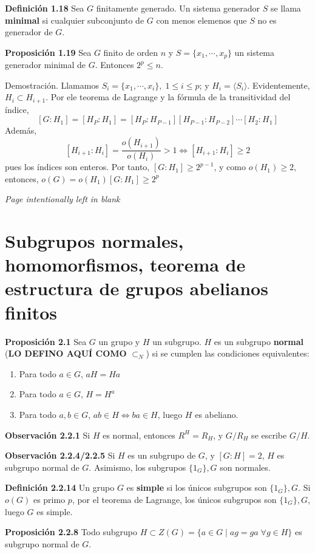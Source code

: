 \documentclass[a4paper, 11pt]{extarticle}
\newcommand{\propo}[1]{\textcolor{rojo}{\textbf{Proposición #1}}}
\newcommand{\defi}[1]{\textcolor{azul}{\textbf{Definición #1}}}
\newcommand{\obs}[1]{\textcolor{verde}{\textbf{Observación #1}}}
\newcommand{\dem}[1]{\textcolor{gris}{\small{Demostración. #1}}}
\begin{document}
\defi{1.18} Sea \(G\) finitamente generado. Un sistema generador \(S\) se
llama \textbf{minimal} si cualquier subconjunto de \(G\) con menos elemenos que \(S\)
no es generador de \(G\).

\propo{1.19} Sea \(G\) finito de orden \(n\) y \(S = \{ x_1, \cdots, x_p \}\)
un
sistema generador minimal de \(G\). Entonces \(2^p \le n\).

\dem{ Llamamos \( S_i = \{ x_1, \cdots, x_i \}, \; 1 \le i \le p \); y \( H_i = \langle S_i \rangle \). 
Evidentemente, \( H_i \subset H_{i+1}
\). Por ele teorema de Lagrange y la fórmula de la transitividad del índice,
\[ [G:H_1] = [H_P:H_1] = [H_P:H_{P-1}][H_{P-1}:H_{P-2}]\cdots[H_2:H_1] \]
Además, 
\[ [H_{i+1}:H_i] = \frac{o(H_{i+1})}{o(H_i)} > 1 \iff
[H_{i+1}:H_i] \ge 2 \]
pues los índices son enteros.
Por tanto, \( [G:H_1] \ge 2^{p-1} \), y como \( o(H_1) \ge 2 \), entonces,
\( o(G) = o(H_1)[G:H_1] \ge 2^p \)
}

\pagebreak
\textcolor{gris}{\textit{Page intentionally left in blank}}
\newpage
\pagebreak


\section{Subgrupos normales, homomorfismos, teorema de estructura de grupos abelianos finitos}
\label{sec:org5cf4b6f}
 \propo{2.1} Sea \(G\) un grupo y \(H\) un subgrupo. \(H\) es un subgrupo
\textbf{normal} (\textbf{LO DEFINO AQUÍ COMO} \(\subset_N\)) si se cumplen las condiciones equivalentes:
\begin{enumerate}
\item Para todo \(a  \in G\), \(aH = Ha\)
\item Para todo \(a \in G\), \(H = H^a\)
\item Para todo \(a,b \in G\), \(ab \in H \iff ba \in H\), luego \(H\) es
abeliano.
\end{enumerate}

\obs{2.2.1} Si \(H\) es normal, entonces \(R^H = R_H\), y \(G/R_H\) se
escribe \(G/H\).

\obs{2.2.4/2.2.5} Si \(H\) es un subgrupo de \(G\), y \([G:H] = 2\), \(H\) es subgrupo normal de \(G\). Asimismo, los subgrupos \(\{ 1_G \}, G\) son 
normales.

\defi{2.2.14} Un grupo \(G\) es \textbf{simple} si los únicos subgrupos son  \(\{ 1_G
\}, G\). Si \(o(G)\) es primo \(p\), por el teorema de Lagrange, los únicos
subgrupos son \(\{ 1_G \}, G\), luego \(G\) es simple.

\propo{2.2.8} Todo subgrupo \(H \subset Z(G) = \{ a \in G \;|\; ag = ga\;
\forall g \in
H\}\) es subgrupo normal de \(G\).
\end{document}
